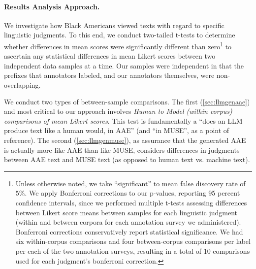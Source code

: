 \paragraph{Results Analysis Approach.}
We investigate how Black Americans viewed texts with regard to specific linguistic judgments. To this end, we conduct two-tailed t-tests to determine whether differences in mean scores were significantly different than zero\footnote{Unless otherwise noted, we take ``significant'' to mean false discovery rate of $5\%$. We apply Bonferroni corrections to our p-values, reporting 95 percent confidence intervals, since we performed multiple t-tests assessing differences between Likert score means between samples for each linguistic judgment (within and between corpora for each annotation survey we administered). Bonferroni corrections conservatively report statistical significance. We had six within-corpus comparisons and four between-corpus comparisons per label per each of the two annotation surveys, resulting in a total of 10 comparisons used for each judgment’s bonferroni correction.} to ascertain any statistical differences in mean Likert scores between two independent data samples at a time. Our samples were independent in that the prefixes that annotators labeled, and our annotators themselves, were non-overlapping. 

We conduct two types of between-sample comparisons. The first (\autoref{sec:llmgenaae}) and most critical to our approach involves \emph{Human to Model (within corpus) comparisons of mean Likert scores}. This test is fundamentally a ``does an LLM produce text like a human would, in AAE'' (and ``in MUSE'', as a point of reference). The second (\autoref{sec:llmgenmuse}), as assurance that the generated AAE is actually more like AAE than like MUSE, considers differences in judgments between AAE text and MUSE text (as opposed to human text vs. machine text).


